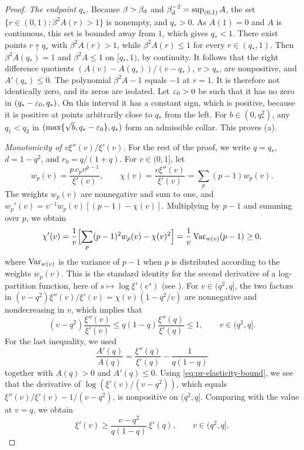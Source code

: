 \begin{proof}
\emph{The endpoint $q_*$.} Because $\beta>\beta_{\mathrm d}$ and $\beta_{\mathrm d}^{-2}=\sup_{(0,1)}A$, the set $\{r\in(0,1)\colon\beta^2A(r)>1\}$ is nonempty, and $q_*>0$. As $A(1)=0$ and $A$ is continuous, this set is bounded away from $1$, which gives $q_*<1$. There exist points $r\uparrow q_*$ with $\beta^2A(r)>1$, while $\beta^2A(r)\le1$ for every $r\in(q_*,1)$. Then $\beta^2A(q_*)=1$ and $\beta^2A\le1$ on $[q_*,1)$, by continuity. It follows that the right difference quotients $(A(v)-A(q_*))/(v-q_*)$, $v>q_*$, are nonpositive, and $A'(q_*)\le0$. The polynomial $\beta^2A-1$ equals $-1$ at $r=1$. It is therefore not identically zero, and its zeros are isolated. Let $\varepsilon_0>0$ be such that it has no zero in $(q_*-\varepsilon_0,q_*)$. On this interval it has a constant sign, which is positive, because it is positive at points arbitrarily close to $q_*$ from the left. For $b\in(0,q_*^2)$, any $q_1<q_2$ in $(\max\{\sqrt b,q_*-\varepsilon_0\},q_*)$ form an admissible collar. This proves (a).

\emph{Monotonicity of $v\xi''(v)/\xi'(v)$.} For the rest of the proof, we write $q=q_*$, $d=1-q^2$, and $r_0=q/(1+q)$. For $v\in(0,1]$, let
\[
w_p(v)=\frac{p\,c_pv^{p-1}}{\xi'(v)},\qquad\chi(v)=\frac{v\xi''(v)}{\xi'(v)}=\sum_p(p-1)w_p(v).
\]
The weights $w_p(v)$ are nonnegative and sum to one, and $w_p'(v)=v^{-1}w_p(v)[(p-1)-\chi(v)]$. Multiplying by $p-1$ and summing over $p$, we obtain
\begin{equation}\label{eq:pr-elasticity}
\chi'(v)=\frac1v\Bigl[\sum_p(p-1)^2w_p(v)-\chi(v)^2\Bigr]=\frac1v\operatorname{Var}_{w(v)}(p-1)\ge0,
\end{equation}
where $\operatorname{Var}_{w(v)}$ is the variance of $p-1$ when $p$ is distributed according to the weights $w_p(v)$. This is the standard identity for the second derivative of a log-partition function, here of $s\mapsto\log\xi'(e^s)$ (see \cite[Proposition~3.1(a)]{WainwrightJordan2008}). For $v\in(q^2,q]$, the two factors in $(v-q^2)\xi''(v)/\xi'(v)=\chi(v)(1-q^2/v)$ are nonnegative and nondecreasing in $v$, which implies that
\begin{equation}\label{eq:pr-elasticity-bound}
(v-q^2)\frac{\xi''(v)}{\xi'(v)}\le q(1-q)\frac{\xi''(q)}{\xi'(q)}\le1,\qquad v\in(q^2,q].
\end{equation}
For the last inequality, we used
\[
\frac{A'(q)}{A(q)}=\frac{\xi''(q)}{\xi'(q)}-\frac1{q(1-q)}
\]
together with $A(q)>0$ and $A'(q)\le0$. Using \eqref{eq:pr-elasticity-bound}, we see that the derivative of $\log(\xi'(v)/(v-q^2))$, which equals $\xi''(v)/\xi'(v)-1/(v-q^2)$, is nonpositive on $(q^2,q]$. Comparing with the value at $v=q$, we obtain
\begin{equation}\label{eq:pr-xi-ratio}
\xi'(v)\ge\frac{v-q^2}{q(1-q)}\,\xi'(q),\qquad v\in(q^2,q].
\end{equation}


\end{proof}
